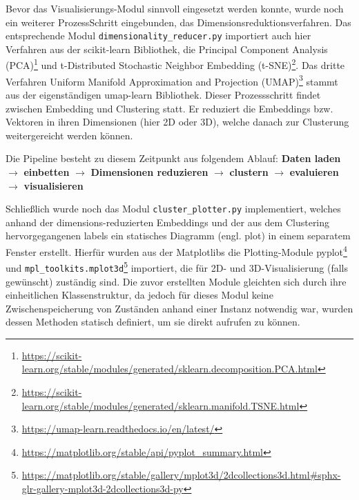 Bevor das Visualisierungs-Modul sinnvoll eingesetzt werden konnte, wurde noch ein weiterer ProzessSchritt eingebunden, das Dimensionsreduktionsverfahren. Das entsprechende Modul \texttt{dimensionality\_reducer.py} importiert auch hier Verfahren aus der scikit-learn Bibliothek, die Principal Component Analysis (PCA)\footnote{\url{https://scikit-learn.org/stable/modules/generated/sklearn.decomposition.PCA.html}} und t-Distributed Stochastic Neighbor Embedding (t-SNE)\footnote{\url{https://scikit-learn.org/stable/modules/generated/sklearn.manifold.TSNE.html}}. Das dritte Verfahren Uniform Manifold Approximation and Projection (UMAP)\footnote{\url{https://umap-learn.readthedocs.io/en/latest/}} stammt aus der eigenständigen umap-learn Bibliothek. Dieser Prozessschritt findet zwischen Embedding und Clustering statt. Er reduziert die Embeddings bzw. Vektoren in ihren Dimensionen (hier 2D oder 3D), welche danach zur Clusterung weitergereicht werden können.

Die Pipeline besteht zu diesem Zeitpunkt aus folgendem Ablauf:
\textbf{Daten laden} $\rightarrow$ \textbf{einbetten} $\rightarrow$ \textbf{Dimensionen reduzieren} $\rightarrow$ \textbf{clustern} $\rightarrow$ \textbf{evaluieren} $\rightarrow$ \textbf{visualisieren}

Schließlich wurde noch das Modul \texttt{cluster\_plotter.py} implementiert, welches anhand der dimensions-reduzierten Embeddings und der aus dem Clustering hervorgegangenen labels ein statisches Diagramm (engl. plot) in einem separatem Fenster erstellt. Hierfür wurden aus der Matplotlibs die Plotting-Module pyplot\footnote{\url{https://matplotlib.org/stable/api/pyplot_summary.html}} und \texttt{mpl\_toolkits.mplot3d}\footnote{\url{https://matplotlib.org/stable/gallery/mplot3d/2dcollections3d.html\#sphx-glr-gallery-mplot3d-2dcollections3d-py}} importiert, die für 2D- und 3D-Visualisierung (falls gewünscht) zuständig sind. Die zuvor erstellten Module gleichten sich durch ihre einheitlichen Klassenstruktur, da jedoch für dieses Modul keine Zwischenspeicherung von Zuständen anhand einer Instanz notwendig war, wurden dessen Methoden statisch definiert, um sie direkt aufrufen zu können.

